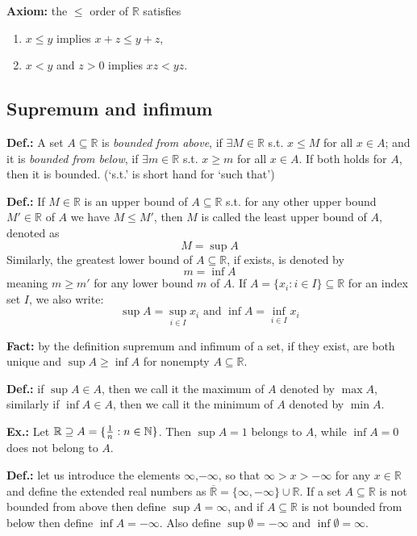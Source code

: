 \documentclass{article}
\begin{document}
\textbf{Axiom:} the $\leq$ order of $\mathbb{R}$ satisfies
\begin{enumerate}[label=\Roman*.]
  \item $x\leq y$ implies $x+z\leq y+z$,
  \item $x< y$ and $z>0$ implies $xz<yz$.
\end{enumerate}

\subsection{Supremum and infimum}

\textbf{Def.:} A set $A\subseteq \mathbb{R}$ is \textit{bounded} \textit{from above}, if $\exists M\in \mathbb{R}$ s.t.  $x\leq M$ for all $x\in A$; and it is \textit{bounded from below}, if $\exists m\in \mathbb{R}$ s.t.  $x\geq m$ for all $x\in A$. If both holds for $A$, then it is bounded.				(‘s.t.’ is short hand for ‘such that’)

\textbf{Def.:} If $M\in \mathbb{R}$ is an upper bound of $A\subseteq \mathbb{R}$ s.t. for any other upper bound $M'\in \mathbb{R}$ of $A$ we have $M\leq M'$, then $M$ is called the least upper bound of $A$, denoted as
\[
M=\sup A
\]
Similarly, the greatest lower bound of $A\subseteq \mathbb{R}$, if exists, is denoted by 
\[
m=\inf A
\]
  meaning $m\geq m'$ for any lower bound $m$ of $A$.
If $A=\{x_i: i\in I\}\subseteq \mathbb{R}$ for an index set $I$, we also write:
\[
\sup A=\sup_{i\in I}x_i \text{ and } \inf A = \inf_{i\in I}x_i
\]

\textbf{Fact:} by the definition supremum and infimum of a set, if they exist, are both unique and $\sup A\geq \inf A$ for nonempty $A\subseteq \mathbb{R}$.

\textbf{Def.:} if $\sup A\in A$, then we call it the maximum of $A$ denoted by $\max A$, similarly if $\inf A \in A$, then we call it the minimum of $A$ denoted by $\min A$.

\textbf{Ex.:} Let $\mathbb{R}\supseteq A=\{{1\over n} : n\in \mathbb{N}\}$. Then $\sup A=1$ belongs to $A$, while $\inf A=0$ does not belong to $A$.

\textbf{Def.:} let us introduce the elements $\infty$,$-\infty$, so that $\infty >x>-\infty$ for any $x\in \mathbb{R}$ and define the extended real numbers as $\overline{\mathbb{R}}=\{\infty, -\infty\}\cup \mathbb{R}$. If a set $A\subseteq \mathbb{R}$ is not bounded from above then define $\sup A=\infty$, and if $A\subseteq \mathbb{R}$ is not bounded from below then define $\inf A=-\infty$. Also define $\sup \emptyset=-\infty$ and $\inf \emptyset = \infty$.
\end{document}
